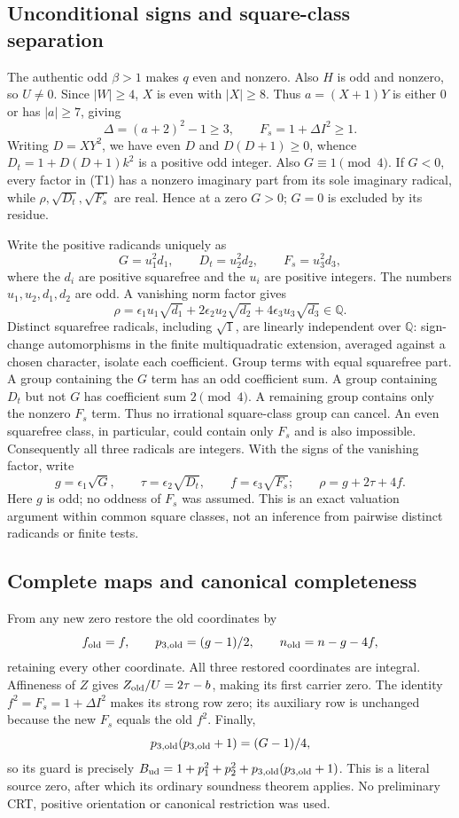 \documentclass[11pt]{article}
\begin{document}
\subsection{Unconditional signs and square-class separation}
The authentic odd $\beta>1$ makes $q$ even and nonzero. Also $H$ is odd and
nonzero, so $U\ne0$. Since $|W|\ge4$, $X$ is even with $|X|\ge8$.
Thus $a=(X+1)Y$ is either $0$ or has $|a|\ge7$, giving
\[
 \Delta=(a+2)^2-1\ge3,\qquad F_s=1+\Delta I^2\ge1.
\]
Writing $D=XY^2$, we have even $D$ and $D(D+1)\ge0$, whence
$D_t=1+D(D+1)k^2$ is a positive odd integer. Also $G\equiv1\pmod4$.
If $G<0$, every factor in (T1) has a nonzero imaginary part from its sole
imaginary radical, while $\rho,\sqrt{D_t},\sqrt{F_s}$ are real. Hence at a zero
$G>0$; $G=0$ is excluded by its residue.

Write the positive radicands uniquely as
\[
 G=u_1^2d_1,\qquad D_t=u_2^2d_2,\qquad F_s=u_3^2d_3,
\]
where the $d_i$ are positive squarefree and the $u_i$ are positive integers.
The numbers $u_1,u_2,d_1,d_2$ are odd. A vanishing norm factor gives
\[
 \rho=\epsilon_1u_1\sqrt{d_1}
       +2\epsilon_2u_2\sqrt{d_2}+4\epsilon_3u_3\sqrt{d_3}\in\mathbb Q.
\]
Distinct squarefree radicals, including $\sqrt1$, are linearly independent over
$\mathbb Q$: sign-change automorphisms in the finite multiquadratic extension,
averaged against a chosen character, isolate each coefficient.
Group terms with equal squarefree part. A group containing the $G$ term has an
odd coefficient sum. A group containing $D_t$ but not $G$ has coefficient sum
$2\pmod4$. A remaining group contains only the nonzero $F_s$ term. Thus no
irrational square-class group can cancel. An even squarefree class, in
particular, could contain only $F_s$ and is also impossible.
Consequently all three radicals are integers. With the signs of the vanishing
factor, write
\[
 g=\epsilon_1\sqrt G,\qquad \tau=\epsilon_2\sqrt{D_t},\qquad
 f=\epsilon_3\sqrt{F_s};\qquad \rho=g+2\tau+4f.
\]
Here $g$ is odd; no oddness of $F_s$ was assumed. This is an exact valuation
argument within common square classes, not an inference from pairwise distinct
radicands or finite tests.

\subsection{Complete maps and canonical completeness}
From any new zero restore the old coordinates by
\[
 f_{\rm old}=f,\qquad p_{3,\rm old}=(g-1)/2,\qquad
 n_{\rm old}=n-g-4f,
\]
retaining every other coordinate. All three restored coordinates are integral.
Affineness of $Z$ gives $Z_{\rm old}/U=2\tau-b$, making its first carrier zero.
The identity $f^2=F_s=1+\Delta I^2$ makes its strong row zero; its auxiliary row
is unchanged because the new $F_s$ equals the old $f^2$. Finally,
\[
 p_{3,\rm old}(p_{3,\rm old}+1)=(G-1)/4,
\]
so its guard is precisely
$B_{\rm ud}=1+p_1^2+p_2^2+p_{3,\rm old}(p_{3,\rm old}+1)$.
This is a literal source zero, after which its ordinary soundness theorem
applies. No preliminary CRT, positive orientation or canonical restriction was
used.
\end{document}
